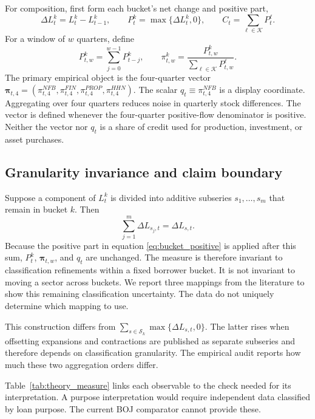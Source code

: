 \documentclass[11pt]{article}
\begin{document}
For composition, first form each bucket's net change and positive part,
\begin{equation}
  \Delta L_t^k=L_t^k-L_{t-1}^k,
  \qquad
  P_t^k=\max\{\Delta L_t^k,0\},
  \qquad C_t=\sum_{\ell\in\mathcal K}P_t^\ell.
  \label{eq:bucket_positive}
\end{equation}
For a window of \(w\) quarters, define
\begin{equation}
  P_{t,w}^k=\sum_{j=0}^{w-1}P_{t-j}^k,
  \qquad
  \pi_{t,w}^k
    =\frac{P_{t,w}^k}{\sum_{\ell\in\mathcal K}P_{t,w}^{\ell}}.
  \label{eq:borrower_composition}
\end{equation}
The primary empirical object is the four-quarter vector
\(\boldsymbol{\pi}_{t,4}=(\pi_{t,4}^{NFB},\pi_{t,4}^{FIN},
\pi_{t,4}^{PROP},\pi_{t,4}^{HHN})\). The scalar
\(q_t\equiv\pi_{t,4}^{NFB}\) is a display coordinate. Aggregating over four
quarters reduces noise in quarterly stock differences. The vector is defined
whenever the four-quarter positive-flow denominator is positive. Neither the
vector nor \(q_t\) is a share of credit used for production, investment, or
asset purchases.

\subsection{Granularity invariance and claim boundary}

Suppose a component of \(L_t^k\) is divided into additive subseries
\(s_1,\ldots,s_m\) that remain in bucket \(k\). Then
\[
 \sum_{j=1}^{m}\Delta L_{s_j,t}=\Delta L_{s,t}.
\]
Because the positive part in equation \eqref{eq:bucket_positive} is applied
after this sum, \(P_t^k\), \(\boldsymbol{\pi}_{t,w}\), and \(q_t\) are unchanged.
The measure is therefore invariant to classification refinements within a
fixed borrower bucket. It is not invariant to moving a sector across buckets.
We report three mappings from the literature to show this remaining
classification uncertainty. The data do not uniquely determine which mapping
to use.

This construction differs from
\(\sum_{s\in\mathcal S_k}\max\{\Delta L_{s,t},0\}\). The latter rises when
offsetting expansions and contractions are published as separate subseries and
therefore depends on classification granularity. The empirical audit reports
how much these two aggregation orders differ.

Table~\ref{tab:theory_measure} links each observable to the check needed for
its interpretation. A purpose interpretation would require independent data
classified by loan purpose. The current BOJ comparator cannot provide these.
\end{document}
